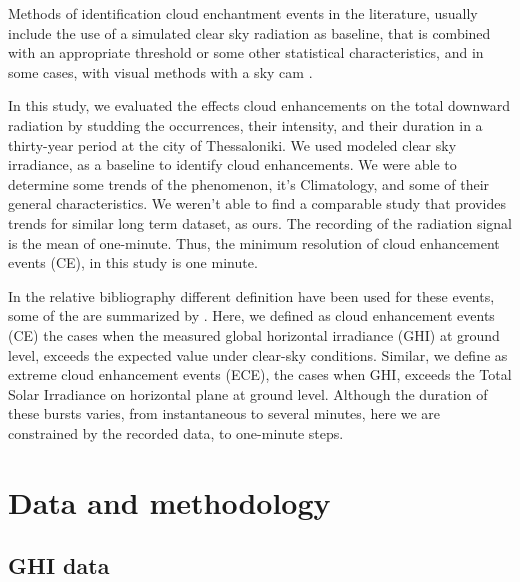 \documentclass[preprint, 3p,
authoryear]{elsarticle} %
\begin{document}
Methods of identification cloud enchantment events in the literature,
usually include the use of a simulated clear sky radiation as baseline,
that is combined with an appropriate threshold or some other statistical
characteristics, and in some cases, with visual methods with a sky cam
\citep[ and references therein]{Vamvakas2020, Mol2023}.

In this study, we evaluated the effects cloud enhancements on the total
downward radiation by studding the occurrences, their intensity, and
their duration in a thirty-year period at the city of Thessaloniki. We
used modeled clear sky irradiance, as a baseline to identify cloud
enhancements. We were able to determine some trends of the phenomenon,
it's Climatology, and some of their general characteristics. We weren't
able to find a comparable study that provides trends for similar long
term dataset, as ours. The recording of the radiation signal is the mean
of one-minute. Thus, the minimum resolution of cloud enhancement events
(CE), in this study is one minute.

In the relative bibliography different definition have been used for
these events, some of the are summarized by \citet{Gueymard2017}. Here,
we defined as cloud enhancement events (CE) the cases when the measured
global horizontal irradiance (GHI) at ground level, exceeds the expected
value under clear-sky conditions. Similar, we define as extreme cloud
enhancement events (ECE), the cases when GHI, exceeds the Total Solar
Irradiance on horizontal plane at ground level. Although the duration of
these bursts varies, from instantaneous to several minutes, here we are
constrained by the recorded data, to one-minute steps.

\hypertarget{data-and-methodology}{%
\section{Data and methodology}\label{data-and-methodology}}

\hypertarget{ghi-data}{%
\subsection{GHI data}\label{ghi-data}}
\end{document}

